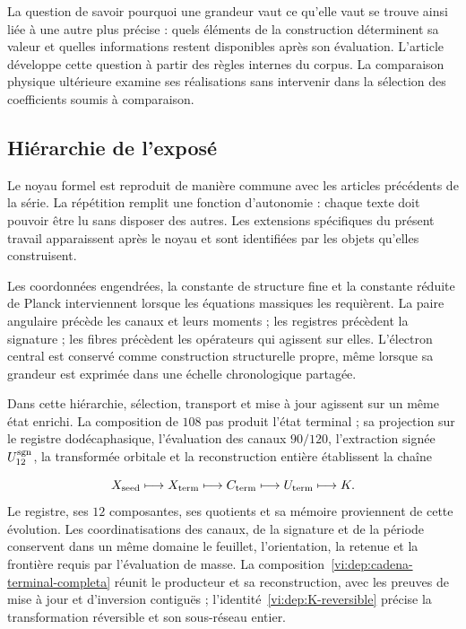 La question de savoir pourquoi une grandeur vaut ce qu’elle vaut se trouve ainsi liée à
une autre plus précise : quels éléments de la construction déterminent sa valeur et
quelles informations restent disponibles après son évaluation. L’article
développe cette question à partir des règles internes du corpus. La
comparaison physique ultérieure examine ses réalisations sans intervenir dans
la sélection des coefficients soumis à comparaison.


\subsection{Hiérarchie de l’exposé
}

Le noyau formel est reproduit de manière commune avec les articles
précédents de la série. La répétition remplit une fonction d’autonomie :
chaque texte doit pouvoir être lu sans disposer des autres. Les extensions
spécifiques du présent travail apparaissent après le noyau et sont
identifiées par les objets qu’elles construisent.


Les coordonnées engendrées, la constante de structure fine et la constante
réduite de Planck interviennent lorsque les équations massiques les
requièrent. La paire angulaire précède les canaux et leurs moments ; les
registres précèdent la signature ; les fibres précèdent les opérateurs qui
agissent sur elles. L’électron central est conservé comme construction
structurelle propre, même lorsque sa grandeur est exprimée dans une échelle
chronologique partagée.


Dans cette hiérarchie, sélection, transport et mise à jour agissent
sur un même état enrichi. La composition de \(108\) pas
produit l’état terminal ; sa projection sur le registre dodécaphasique,
l’évaluation des canaux \(90/120\), l’extraction signée
\(U_{12}^{\rm sgn}\), la transformée orbitale et la reconstruction
entière établissent la chaîne

\[
 X_{\rm seed}\longmapsto X_{\rm term}\longmapsto
 C_{\rm term}\longmapsto U_{\rm term}\longmapsto K.
\]
Le registre, ses \(12\) composantes, ses quotients et sa mémoire proviennent
de cette évolution. Les coordinatisations des canaux, de la signature et de la période conservent dans un
même domaine le feuillet, l’orientation, la retenue et la frontière requis
par l’évaluation de masse. La composition~\eqref{vi:dep:cadena-terminal-completa}
réunit le producteur et sa reconstruction, avec les preuves de mise à jour et
d’inversion contiguës ; l’identité~\eqref{vi:dep:K-reversible} précise la
transformation réversible et son sous-réseau entier.


